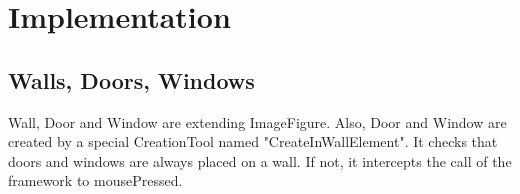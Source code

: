 \section{Implementation}

\subsection{Walls, Doors, Windows}

Wall, Door and Window are extending ImageFigure.
Also, Door and Window are created by a special CreationTool named "CreateInWallElement".
It checks that doors and windows are always placed on a wall.
If not, it intercepts the call of the framework to mousePressed.
